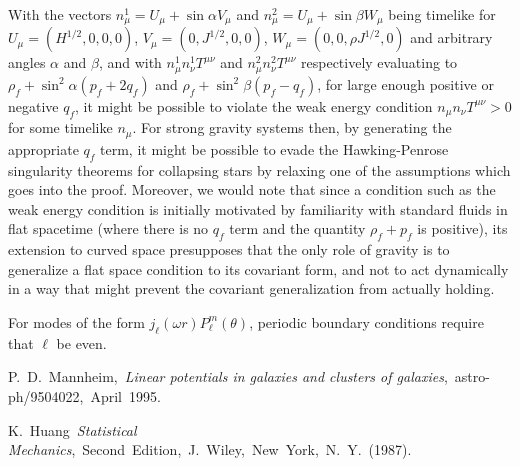 \begin{thebibliography}{10}
 With the vectors $n^1_{\mu}=U_{\mu}+\sin\alpha V_{\mu}$ and $n^2_{\mu}=U_{\mu}+\sin\beta W_{\mu}$ being timelike for $U_{\mu}=(H^{1/2},0,0,0)$, $V_{\mu}=(0,J^{1/2},0,0)$, $W_{\mu}=(0,0,\rho J^{1/2},0)$ and arbitrary angles $\alpha$ and $\beta$, and with $n^1_{\mu}n^1_{\nu}T^{\mu\nu}$ and $n^2_{\mu}n^2_{\nu}T^{\mu\nu}$ respectively evaluating to $\rho_f+\sin^2\alpha (p_f+2q_f)$ and $\rho_f+\sin^2\beta(p_f-q_f)$, for large enough positive or negative $q_f$, it might be possible to violate the weak energy condition $n_{\mu}n_{\nu}T^{\mu\nu} >0$ for some timelike $n_{\mu}$. For strong gravity systems then, by generating the appropriate $q_f$ term, it might be possible to evade the Hawking-Penrose singularity theorems for collapsing stars by relaxing one of the assumptions which goes into the proof. Moreover, we would note that since a condition such as the weak energy condition is initially motivated by familiarity with standard fluids in flat spacetime (where there is no $q_f$ term and the quantity $\rho_f+p_f$ is positive), its extension to curved space presupposes that the only role of gravity is to generalize a flat space condition to its covariant form, and not to act dynamically in a way that might prevent the covariant generalization from actually holding.

 For modes of the form $j_{\ell}(\omega r)P^m_{\ell}(\theta)$, periodic boundary conditions require that $\ell$ be even.

 P.~D.~Mannheim,~{\it Linear potentials in galaxies and clusters of galaxies},~astro-ph/9504022,~April~1995. 

 K.~Huang~{\it Statistical Mechanics},~Second~Edition,~J.~Wiley,~New~York,~N.~Y.~(1987).


\end{thebibliography}
